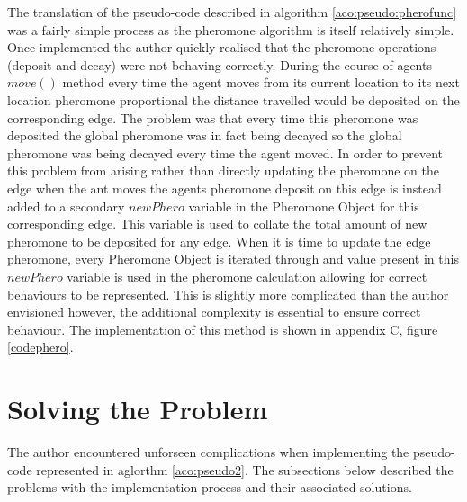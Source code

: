 The translation of the pseudo-code described in algorithm \ref{aco:pseudo:pherofunc} was a fairly simple process as the pheromone algorithm is itself relatively simple. Once implemented the author quickly realised that the pheromone operations (deposit and decay) were not behaving correctly. During the course of agents $move()$ method every time the agent moves from its current location to its next location pheromone proportional the distance travelled would be deposited on the corresponding edge. The problem was that every time this pheromone was deposited the global pheromone was in fact being decayed so the global pheromone was being decayed every time the agent moved. In order to prevent this problem from arising rather than directly updating the pheromone on the edge when the ant moves the agents pheromone deposit on this edge is instead added to a secondary $newPhero$ variable in the Pheromone Object for this corresponding edge. This variable is used to collate the total amount of new pheromone to be deposited for any edge. When it is time to update the edge pheromone, every Pheromone Object is iterated through and value present in this $newPhero$ variable is used in the pheromone calculation allowing for correct behaviours to be represented. This is slightly more complicated than the author envisioned however, the additional complexity is essential to ensure correct behaviour. The implementation of this method is shown in appendix C, figure \ref{codephero}.

\section{Solving the Problem}

The author encountered unforseen complications when implementing the pseudo-code represented in aglorthm \ref{aco:pseudo2}. The subsections below described the problems with the implementation process and their associated solutions.

